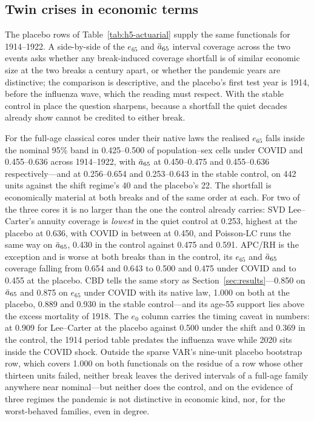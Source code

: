 \subsection{Twin crises in economic terms}

The placebo rows of Table~\ref{tab:h5-actuarial} supply the same
functionals for 1914--1922. A side-by-side of the $e_{65}$ and $\ddot{a}_{65}$
interval coverage across the two events asks whether any break-induced
coverage shortfall is of similar economic size at the two breaks a century
apart, or whether the pandemic years are distinctive; the comparison is
descriptive, and the placebo's first test year is 1914, before the
influenza wave, which the reading must respect. With the stable control in
place the question sharpens, because a shortfall the quiet decades already
show cannot be credited to either break.

For the full-age classical cores under their native laws the realised
$e_{65}$ falls inside the nominal 95\% band in 0.425--0.500 of
population--sex cells under COVID and 0.455--0.636 across 1914--1922, with
$\ddot{a}_{65}$ at 0.450--0.475 and 0.455--0.636 respectively---and at
0.256--0.654 and 0.253--0.643 in the stable control, on 442 units against
the shift regime's 40 and the placebo's 22. The shortfall is economically
material at both breaks and of the same order at each. For two of the three
cores it is no larger than the one the control already carries: SVD
Lee--Carter's annuity coverage is \emph{lowest} in the quiet control at
0.253, highest at the placebo at 0.636, with COVID in between at 0.450, and
Poisson-LC runs the same way on $\ddot{a}_{65}$, 0.430 in the control against
0.475 and 0.591. APC/RH is the exception and is worse at both breaks than
in the control, its $e_{65}$ and $\ddot{a}_{65}$ coverage falling from 0.654 and
0.643 to 0.500 and 0.475 under COVID and to 0.455 at the placebo. CBD tells
the same story as Section~\ref{sec:results}---0.850 on $\ddot{a}_{65}$ and 0.875 on $e_{65}$ under
COVID with its native law, 1.000 on both at the placebo, 0.889 and 0.930 in
the stable control---and its age-55 support lies above the excess mortality
of 1918. The $e_0$ column carries the timing caveat in numbers: at 0.909
for Lee--Carter at the placebo against 0.500 under the shift and 0.369 in
the control, the 1914 period table predates the influenza wave while 2020
sits inside the COVID shock. Outside the sparse VAR's nine-unit placebo
bootstrap row, which covers 1.000 on both functionals on the residue of a
row whose other thirteen units failed, neither break leaves the derived
intervals of a full-age family anywhere near nominal---but neither does the
control, and on the evidence of three regimes the pandemic is not
distinctive in economic kind, nor, for the worst-behaved families, even in
degree.
